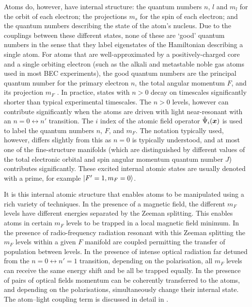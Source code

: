 Atoms do, however, have internal structure: the quantum numbers $n$, $l$ and $m_l$ for the orbit of each electron; the projections $m_s$ for the spin of each electron; and the quantum numbers describing the state of the atom's nucleus.  Due to the couplings between these different states, none of these are `good' quantum numbers in the sense that they label eigenstates of the Hamiltonian describing a single atom.  For atoms that are well-approximated by a positively-charged core and a single orbiting electron (such as the alkali and metastable noble gas atoms used in most BEC experiments), the good quantum numbers are the principal quantum number for the primary electron $n$, the total angular momentum $F$, and its projection $m_F$ \citep{Leggett:2001}.  In practice, states with $n > 0$ decay on timescales significantly shorter than typical experimental timescales.  The $n > 0$ levels, however can contribute significantly when the atoms are driven with light near-resonant with an $n = 0 \leftrightarrow n'$ transition.  The $i$ index of the atomic field operator $\hat{\Psi}_i(\bm{x})$ is used to label the quantum numbers $n$, $F$, and $m_F$.  The notation typically used, however, differs slightly from this as $n=0$ is typically understood, and at most one of the fine-structure manifolds (which are distinguished by different values of the total electronic orbital and spin angular momentum quantum number $J$) contributes significantly.  These excited internal atomic states are usually denoted with a prime, for example ${\left|F'=1, m_F=0\right>}$.

It is this internal atomic structure that enables atoms to be manipulated using a rich variety of techniques.  In the presence of a magnetic field, the different $m_F$ levels have different energies separated by the Zeeman splitting.  This enables atoms in certain $m_F$ levels to be trapped in a local magnetic field minimum.  In the presence of radio-frequency radiation resonant with this Zeeman splitting the $m_F$ levels within a given $F$ manifold are coupled permitting the transfer of population between levels.  In the presence of intense optical radiation far detuned from the $n=0 \leftrightarrow n'=1$ transition, depending on the polarisation, all $m_F$ levels can receive the same energy shift and be all be trapped equally.  In the presence of pairs of optical fields momentum can be coherently transferred to the atoms, and depending on the polarisations, simultaneously change their internal state.  The atom--light coupling term is discussed in detail in .

